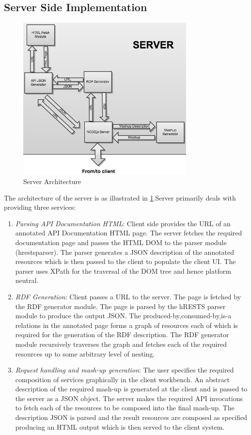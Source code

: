 \documentclass[journal]{IEEEtran}
\begin{document}
\subsection{Server Side Implementation}
\begin{figure}[!ht]
    \centering
    \includegraphics[width=3.5in]{images/server_arch.png}
    \caption{Server Architecture}
   \label{fig:server_arch}
\end{figure}
The architecture of the server is as illustrated in \ref{fig:server_arch}.Server primarily deals with providing three services:
\begin{enumerate}
    \item {\it Parsing API Documentation HTML}: Client side provides the URL of an annotated API     Documentation HTML page. The server fetches the required documentation page and passes 	the HTML DOM to the parser module (hrestsparser). The parser generates a JSON 	description of the annotated resources which is then passed to the client to populate the 	client UI. The parser uses XPath for the traversal of the DOM tree and hence platform 	neutral.
	\item {\it RDF Generation}: Client passes a URL to the server. The page is fetched by the RDF 	generator module. The page is parsed by the hRESTS parser module  to produce the output 	JSON. The produced-by,consumed-by,is-a relations in the annotated page forms a graph of 	resources each of which is required for the generation of the RDF description. The RDF 	generator module recursively traverses the graph and fetches each of the 	required resources 	up to some arbitrary level of nesting.
	\item {\it Request handling and mash-up generation}: The user specifies the required composition of 	services graphically in the client workbench. An abstract description of the required mash-up 	is generated at the client and is passed to the server as a JSON object. The server makes the 	required API invocations to fetch each of the resources to be composed into the final 	mash-up. The description JSON is parsed and the result resources are composed as specified 	producing an HTML output which is then served to the client system.
\end{enumerate}
\end{document}
